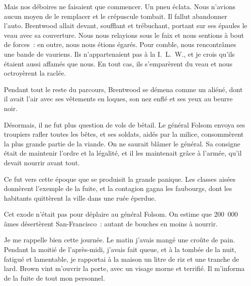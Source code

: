 \documentclass[french,twoside]{book} %
\newcommand{\astermono}{\medskip\centerline{\color{rubric}\large\selectfont{\syms ✻}}\medskip\par}%
\begin{document}
Mais nos déboires ne faisaient que commencer. Un pneu éclata. Nous n’avions aucun moyen de le remplacer et le crépuscule tombait. Il fallut abandonner l’auto. Brentwood allait devant, soufflant et trébuchant, portant sur ses épaules le veau avec sa couverture. Nous nous relayions sous le faix et nous sentions à bout de forces : en outre, nous nous étions égarés. Pour comble, nous rencontrâmes une bande de vauriens. Ils n’appartenaient pas à la I. L. W., et je crois qu’ils étaient aussi affamés que nous. En tout cas, ils s’emparèrent du veau et nous octroyèrent la raclée.\par
Pendant tout le reste du parcours, Brentwood se démena comme un aliéné, dont il avait l’air avec ses vêtements en loques, son nez enflé et ses yeux au beurre noir.\par
Désormais, il ne fut plus question de vols de bétail. Le général Folsom envoya ses troupiers rafler toutes les bêtes, et ses soldats, aidés par la milice, consommèrent la plus grande partie de la viande. On ne saurait blâmer le général. Sa consigne était de maintenir l’ordre et la légalité, et il les maintenait grâce à l’armée, qu’il devait nourrir avant tout.\par
Ce fut vers cette époque que se produisit la grande panique. Les classes aisées donnèrent l’exemple de la fuite, et la contagion gagna les faubourgs, dont les habitants quittèrent la ville dans une ruée éperdue.\par
Cet exode n’était pas pour déplaire au général Folsom. On estime que 200 000 âmes désertèrent San-Francisco : autant de bouches en moins à nourrir.\par
Je me rappelle bien cette journée. Le matin j’avais mangé une croûte de pain. Pendant la moitié de l’après-midi, j’avais fait queue, et à la tombée de la nuit, fatigué et lamentable, je rapportai à la maison un litre de riz et une tranche de lard. Brown vint m’ouvrir la porte, avec un visage morne et terrifié. Il m’informa de la fuite de tout mon personnel.\par

\astermono
\end{document}
